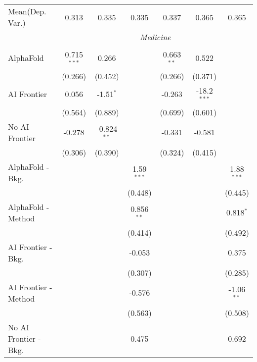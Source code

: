 \begin{tabular}{lcccccc}
Mean(Dep. Var.) & 0.313 & 0.335 & 0.335 & 0.337 & 0.365 & 0.365 \\
 & \multicolumn{6}{c}{\textit{Medicine}} \\ \\
   AlphaFold               & 0.715$^{***}$ & 0.266         &              & 0.663$^{**}$ & 0.522         &   \\   
                           & (0.266)       & (0.452)       &              & (0.266)      & (0.371)       &   \\   
   AI Frontier             & 0.056         & -1.51$^{*}$   &              & -0.263       & -18.2$^{***}$ &   \\   
                           & (0.564)       & (0.889)       &              & (0.699)      & (0.601)       &   \\   
   No AI Frontier          & -0.278        & -0.824$^{**}$ &              & -0.331       & -0.581        &   \\   
                           & (0.306)       & (0.390)       &              & (0.324)      & (0.415)       &   \\   
   AlphaFold - Bkg.        &               &               & 1.59$^{***}$ &              &               & 1.88$^{***}$\\   
                           &               &               & (0.448)      &              &               & (0.445)\\   
   AlphaFold - Method      &               &               & 0.856$^{**}$ &              &               & 0.818$^{*}$\\   
                           &               &               & (0.414)      &              &               & (0.492)\\   
   AI Frontier - Bkg.      &               &               & -0.053       &              &               & 0.375\\   
                           &               &               & (0.307)      &              &               & (0.285)\\   
   AI Frontier - Method    &               &               & -0.576       &              &               & -1.06$^{**}$\\   
                           &               &               & (0.563)      &              &               & (0.508)\\   
   No AI Frontier - Bkg.   &               &               & 0.475        &              &               & 0.692\\   

\end{tabular}
